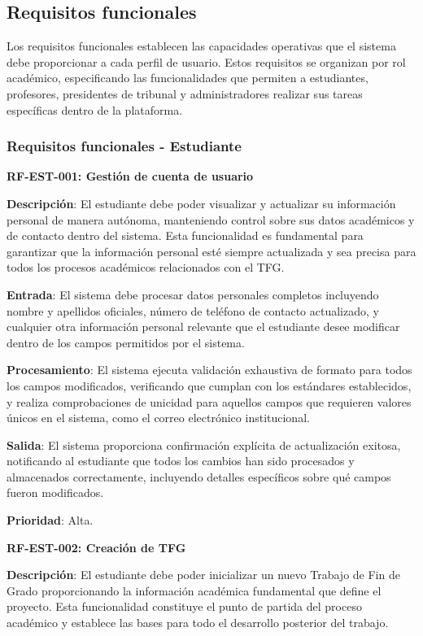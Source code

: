 \documentclass[12pt,a4paper,oneside]{report}
\begin{document}
\subsection{Requisitos funcionales}\label{requisitos-funcionales}

Los requisitos funcionales establecen las capacidades operativas que el sistema debe proporcionar a cada perfil de usuario. Estos requisitos se organizan por rol académico, especificando las funcionalidades que permiten a estudiantes, profesores, presidentes de tribunal y administradores realizar sus tareas específicas dentro de la plataforma.

\subsubsection{Requisitos funcionales -
Estudiante}\label{requisitos-funcionales---estudiante}

\textbf{RF-EST-001: Gestión de cuenta de usuario}

\textbf{Descripción}: El estudiante debe poder visualizar y actualizar su información personal de manera autónoma, manteniendo control sobre sus datos académicos y de contacto dentro del sistema. Esta funcionalidad es fundamental para garantizar que la información personal esté siempre actualizada y sea precisa para todos los procesos académicos relacionados con el TFG.

\textbf{Entrada}: El sistema debe procesar datos personales completos incluyendo nombre y apellidos oficiales, número de teléfono de contacto actualizado, y cualquier otra información personal relevante que el estudiante desee modificar dentro de los campos permitidos por el sistema.

\textbf{Procesamiento}: El sistema ejecuta validación exhaustiva de formato para todos los campos modificados, verificando que cumplan con los estándares establecidos, y realiza comprobaciones de unicidad para aquellos campos que requieren valores únicos en el sistema, como el correo electrónico institucional.

\textbf{Salida}: El sistema proporciona confirmación explícita de actualización exitosa, notificando al estudiante que todos los cambios han sido procesados y almacenados correctamente, incluyendo detalles específicos sobre qué campos fueron modificados.

\textbf{Prioridad}: Alta.

\textbf{RF-EST-002: Creación de TFG}

\textbf{Descripción}: El estudiante debe poder inicializar un nuevo Trabajo de Fin de Grado proporcionando la información académica fundamental que define el proyecto. Esta funcionalidad constituye el punto de partida del proceso académico y establece las bases para todo el desarrollo posterior del trabajo.
\end{document}
